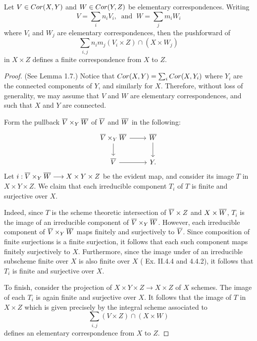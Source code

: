 \begin{lem}\label{lem_cor_composition}
Let $V \in Cor(X, Y)$ and $W \in Cor(Y, Z)$ be elementary 
correspondences. Writing
\[
V = \sum_i n_i V_i, \;\;\textrm{and}\;\; W = \sum_j m_i W_i
\]
where $V_i$ and $W_j$ are elementary correspondences, then
the pushforward of
\[
\sum_{i, j} n_im_j (V_i \times Z) \cap (X \times W_j)
\]
in $X \times Z$ defines a finite correspondence from $X$ to $Z$.
\end{lem}
\begin{proof}(See \cite{MVW} Lemma 1.7.)
Notice that $Cor(X, Y) = \sum_i Cor(X, Y_i)$ where $Y_i$ are the 
connected components of $Y$, and similarly for $X$. Therefore, 
without loss of generality, we may assume that $V$ and $W$ are 
elementary correspondences, and such that $X$ and $Y$ are 
connected.

Form the pullback $\overline{V} \times_Y \overline{W}$ of $\overline{V}$ and
$\overline{W}$ in the following:
\[
\begin{tikzcd}
\Sch{V} \times_Y \Sch{W} \arrow{r} \arrow{d}
&\Sch{W} \arrow{d} \\
\Sch{V} \arrow{r}& Y.
\end{tikzcd}
\]
Let $i: \overline{V} \times_Y \overline{W} \longrightarrow X \times Y \times Z$ be the
evident map, and consider its image $T$ in $X \times Y \times Z$. 
We claim that each irreducible component $T_i$ of $T$ is finite 
and surjective over $X$. 

Indeed, since $T$ is the scheme theoretic intersection 
of $\overline{V} \times Z$ and $X \times \overline{W}$, $T_i$ is the image 
of an irreducible component of $\overline{V} \times_Y \overline{W}$. 
However, each irreducible component of $\overline{V} \times_Y \overline{W}$ 
maps finitely and surjectively to $\overline{V}$. Since composition of
finite surjections is a finite surjection, it follows that each
such component maps finitely surjectively to $X$. Furthermore, 
since the image under of an irreducible subscheme finite over $X$ is 
also finite over $X$ (\cite{Hart} Ex. II.4.4 and \cite{EGA3} 
4.4.2), it follows that $T_i$ is finite and surjective over $X$.

To finish, consider the projection of $X \times Y \times Z \to 
X \times Z$ of $X$ schemes. The image of each $T_i$ is again finite
and surjective over $X$. It follows that the image of $T$ in $X 
\times Z$ which is given precisely by the integral scheme associated 
to
\[
\sum_{i, j} (V \times Z) \cap (X \times W)
\]
defines an elementary correspondence from $X$ to $Z$.
\end{proof}

